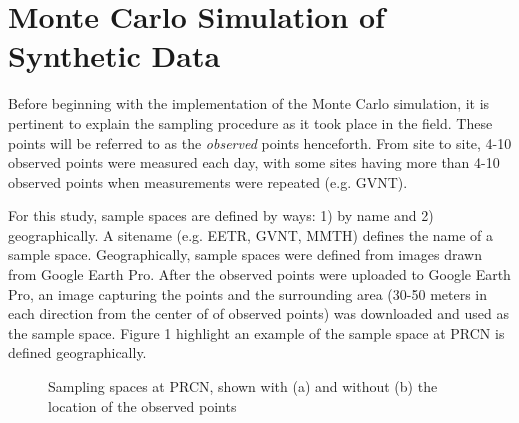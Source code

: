 \section{Monte Carlo Simulation of Synthetic Data}

\noindent
Before beginning with the implementation of the Monte Carlo simulation, it is pertinent to explain the sampling procedure as  it took place in the field.  These points will be referred to as the \textit{observed} points henceforth.  From site to site, 4-10 observed points were measured each day, with some sites having more than 4-10 observed points when measurements were repeated (e.g. GVNT).  

\vspace{3mm} \par \noindent
For this study, sample spaces are defined by ways: 1) by name and 2) geographically.  A sitename (e.g. EETR, GVNT, MMTH) defines the name of a sample space. Geographically, sample spaces were defined from images drawn from Google Earth Pro. After the observed points were uploaded to Google Earth Pro, an image capturing the points and the surrounding area (30-50 meters in each direction from the center of of observed points) was downloaded and used as the sample space.  Figure 1 highlight an example of the sample space at PRCN is defined geographically.

\begin{figure}[h]
    \centering
    \caption{Sampling spaces at PRCN, shown with (a) and without (b) the location of the observed points}
    \label{fig:subfigures}
\end{figure}

